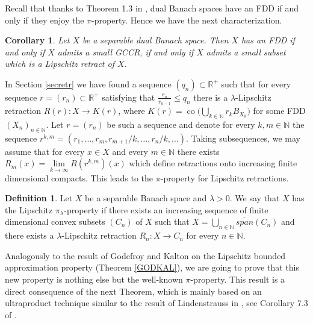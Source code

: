 \documentclass[11pt]{amsart}
\newcommand{\N}{\mathbb{N}}
\newcommand{\R}{\mathbb{R}}
\DeclareMathOperator{\co}{co}
\newcommand{\<}{\langle}
\renewcommand{\>}{\rangle}
\newtheorem{corollary}[theorem]{Corollary}
\theoremstyle{definition}
\newtheorem{definition}[theorem]{Definition}
\theoremstyle{remark}
\numberwithin{equation}{section}
\def\R{{\mathbb R}}
\begin{document}
Recall that thanks to Theorem 1.3 in \cite{Joh2}, dual Banach spaces have an FDD if and only if they enjoy the $\pi$-property. Hence we have the next characterization.
\begin{corollary}
Let $X$ be a separable dual  Banach space. Then $X$ has an FDD if and only if $X$ admits a small GCCR, if and only if $X$ admits a small subset which is a Lipschitz retract of $X$.
\end{corollary}

In Section \ref{secretr} we have found a sequence $(q_n)\subset \R^+$ such that for every sequence $r=(r_n)\subset \R^+$ satisfying that $\frac{r_n}{r_{n-1}}\le q_n$ there is a $\lambda$-Lipschitz retraction $R(r):X\rightarrow K(r)$, where $K(r)=\co\Big(\bigcup\limits_{k\in\N}r_kB_{X_k}\Big)$ for some FDD $(X_n)_{n\in\N}$.  Let $r=(r_n)$ be such a sequence and denote for every $k,m\in\N$ the sequence $r^{k,m}=(r_1,\dots,r_m,r_{m+1}/k,\dots,r_n/k,\dots)$. Taking subsequences, we may assume that for every $x\in X$ and every $m\in\N$ there exists $R_m(x)=\lim\limits_{k\to\infty}R(r^{k,m})(x)$ which define retractions onto increasing finite dimensional compacts. This leads to the $\pi$-property for Lipschitz retractions.

\begin{definition}
Let $X$ be a separable Banach space and $\lambda>0$. We say that $X$ has the Lipschitz $\pi_\lambda$-property if there exists an increasing sequence of finite dimensional convex subsets $(C_n)$ of $X$ such that $X=\overline{\bigcup\limits_{n\in\N}span (C_n)}$ and there exists a $\lambda$-Lipschitz retraction $R_n:X\rightarrow C_n$ for every $n \in\N$.
\end{definition}

Analogously to the result of Godefroy and Kalton on the Lipschitz bounded approximation property (Theorem \ref{GODKAL}), we are going to prove that this new property is nothing else but the well-known $\pi$-property. This result is a direct consequence of the next Theorem, which is mainly based on an
ultraproduct technique  similar to the result of Lindenstrauss in \cite{Lin64}, see Corollary 7.3 of \cite{BL2000}.
\end{document}
